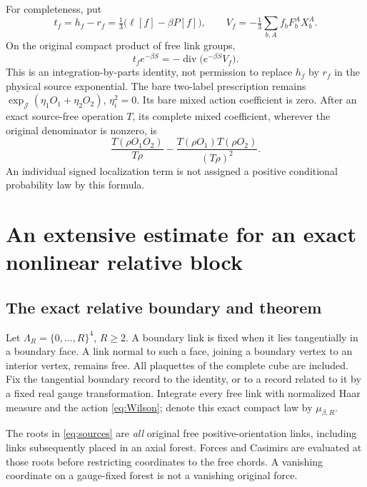 \documentclass[11pt,letterpaper]{article}
\numberwithin{equation}{section}
\theoremstyle{definition}\newtheorem{definition}[theorem]{Definition}
\theoremstyle{remark}\newtheorem{remark}[theorem]{Remark}
\begin{document}
For completeness, put
\[
 t_f=h_f-r_f=\tfrac13\bigl(\ell[f]-\beta P[f]\bigr),\qquad
 V_f=-\tfrac13\sum_{b,A}f_bF_b^AX_b^A.
\]
On the original compact product of free link groups,
\begin{equation}
 t_fe^{-\beta S}=-\operatorname{div}\bigl(e^{-\beta S}V_f\bigr).
 \label{eq:ward}
\end{equation}
This is an integration-by-parts identity, not permission to replace $h_f$ by $r_f$ in the physical source exponential. The bare two-label prescription remains
$\exp_{\mathcal J}(\eta_1O_1+\eta_2O_2)$, $\eta_i^2=0$. Its bare mixed action coefficient is zero. After an exact source-free operation $T$, its complete mixed coefficient, wherever the original denominator is nonzero, is
\begin{equation}
 \frac{T(\rho O_1O_2)}{T\rho}
 -\frac{T(\rho O_1)T(\rho O_2)}{(T\rho)^2}.
 \label{eq:physicalcov}
\end{equation}
An individual signed localization term is not assigned a positive conditional probability law by this formula.

\section{An extensive estimate for an exact nonlinear relative block}
\label{sec:block}
\subsection{The exact relative boundary and theorem}

Let $\Lambda_R=\{0,\ldots,R\}^4$, $R\ge2$. A boundary link is fixed when it lies tangentially in a boundary face. A link normal to such a face, joining a boundary vertex to an interior vertex, remains free. All plaquettes of the complete cube are included. Fix the tangential boundary record to the identity, or to a record related to it by a fixed real gauge transformation. Integrate every free link with normalized Haar measure and the action \eqref{eq:Wilson}; denote this exact compact law by $\mu_{\beta,R}$.

The roots in \eqref{eq:sources} are \emph{all} original free positive-orientation links, including links subsequently placed in an axial forest. Forces and Casimirs are evaluated at those roots before restricting coordinates to the free chords. A vanishing coordinate on a gauge-fixed forest is not a vanishing original force.
\end{document}
